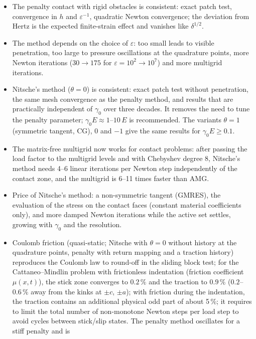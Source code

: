 \documentclass[11pt,a4paper]{article}
\begin{document}
\begin{itemize}
  \item The penalty contact with rigid obstacles is consistent: exact patch test, convergence in
    $h$ and $\varepsilon^{-1}$, quadratic Newton convergence; the deviation from Hertz is the
    expected finite-strain effect and vanishes like $\delta^{1/2}$.
  \item The method depends on the choice of $\varepsilon$: too small leads to visible
    penetration, too large to pressure oscillations at the quadrature points, more Newton
    iterations ($30\to175$ for $\varepsilon=10^2\to10^7$) and more multigrid iterations.
  \item Nitsche's method ($\theta=0$) is consistent: exact patch test without penetration, the same
    mesh convergence as the penalty method, and results that are practically independent of
    $\gamma_0$ over three decades. It removes the need to tune the penalty parameter;
    $\gamma_0 E \approx 1$--$10\,E$ is recommended. The variants $\theta=1$ (symmetric tangent, CG),
    $0$ and $-1$ give the same results for $\gamma_0E\ge0.1$.
  \item The matrix-free multigrid now works for contact problems: after passing the load factor
    to the multigrid levels and with Chebyshev degree 8, Nitsche's method needs 4--6 linear
    iterations per Newton step independently of the contact zone, and the multigrid is 6--11 times
    faster than AMG.
  \item Price of Nitsche's method: a non-symmetric tangent (GMRES), the evaluation of the stress on
    the contact faces (constant material coefficients only), and more damped Newton iterations
    while the active set settles, growing with $\gamma_0$ and the resolution.
  \item Coulomb friction (quasi-static; Nitsche with $\theta=0$ without history at the quadrature
    points, penalty with return mapping and a traction history) reproduces the Coulomb law to
    round-off in the sliding block test; for the Cattaneo--Mindlin problem with frictionless
    indentation (friction coefficient $\mu(x,t)$), the stick zone converges to $0.2\,\%$ and the
    traction to $0.9\,\%$ ($0.2$--$0.6\,\%$ away from the kinks at $\pm c$, $\pm a$); with friction
    during the indentation, the traction contains an additional physical odd part of about 5\,\%; it requires to limit the total number of non-monotone Newton steps per load step to
    avoid cycles between stick/slip states. The penalty method oscillates for a stiff penalty and is

\end{itemize}
\end{document}

